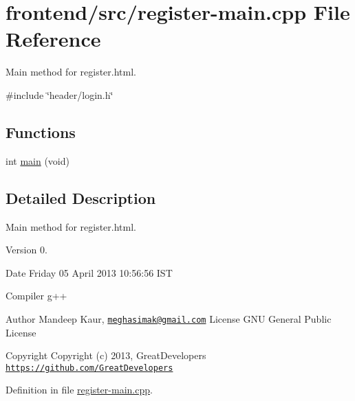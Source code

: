 \hypertarget{register-main_8cpp}{\section{frontend/src/register-\/main.cpp \-File \-Reference}
\label{register-main_8cpp}
}


\-Main method for register.\-html.  


{\ttfamily \#include \char`\"{}header/login.\-h\char`\"{}}\*
\subsection*{\-Functions}
\begin{DoxyCompactItemize}
\item 
int \hyperlink{register-main_8cpp_a840291bc02cba5474a4cb46a9b9566fe}{main} (void)
\end{DoxyCompactItemize}


\subsection{\-Detailed \-Description}
\-Main method for register.\-html. \begin{DoxyVersion}{\-Version}
0. 
\end{DoxyVersion}
\begin{DoxyDate}{\-Date}
\-Friday 05 \-April 2013 10\-:56\-:56 \-I\-S\-T\par
 \-Compiler g++
\end{DoxyDate}
\begin{DoxyAuthor}{\-Author}
\-Mandeep \-Kaur, \href{mailto:meghasimak@gmail.com}{\tt meghasimak@gmail.\-com} \-License \-G\-N\-U \-General \-Public \-License 
\end{DoxyAuthor}
\begin{DoxyCopyright}{\-Copyright}
\-Copyright (c) 2013, \-Great\-Developers \href{https://github.com/GreatDevelopers}{\tt https\-://github.\-com/\-Great\-Developers} 
\end{DoxyCopyright}


\-Definition in file \hyperlink{register-main_8cpp_source}{register-\/main.\-cpp}.



